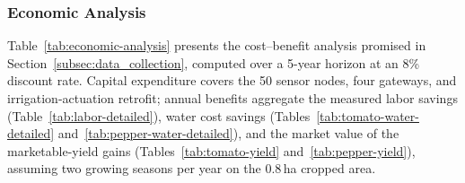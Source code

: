 \documentclass[pdflatex,sn-mathphys-num]{sn-jnl}
\theoremstyle{thmstyleone}
\theoremstyle{thmstyletwo}
\theoremstyle{thmstylethree}
\begin{document}
\subsubsection{Economic Analysis}
\label{subsubsec:economic_analysis}

Table~\ref{tab:economic-analysis} presents the cost--benefit analysis promised in Section~\ref{subsec:data_collection}, computed over a 5-year horizon at an 8\% discount rate. Capital expenditure covers the 50 sensor nodes, four gateways, and irrigation-actuation retrofit; annual benefits aggregate the measured labor savings (Table~\ref{tab:labor-detailed}), water cost savings (Tables~\ref{tab:tomato-water-detailed} and~\ref{tab:pepper-water-detailed}), and the market value of the marketable-yield gains (Tables~\ref{tab:tomato-yield} and~\ref{tab:pepper-yield}), assuming two growing seasons per year on the 0.8\,ha cropped area.
\end{document}
